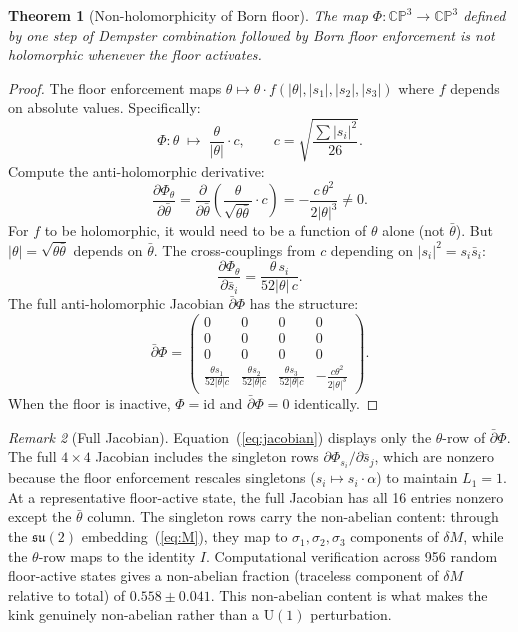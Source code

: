 \documentclass[11pt,a4paper]{article}
\newtheorem{theorem}{Theorem}[section]
\theoremstyle{definition}
\theoremstyle{remark}
\newtheorem{remark}[theorem]{Remark}
\newcommand{\CP}{\mathbb{CP}}
\newcommand{\dbar}{\bar{\partial}}
\newcommand{\su}{\mathfrak{su}}
\begin{document}
\begin{theorem}[Non-holomorphicity of Born floor]\label{thm:nonholo}
The map $\Phi:\CP^3\to\CP^3$ defined by one step of Dempster combination followed by Born floor enforcement is not holomorphic whenever the floor activates.
\end{theorem}

\begin{proof}
The floor enforcement maps $\theta\mapsto\theta\cdot f(|\theta|,|s_1|,|s_2|,|s_3|)$ where $f$ depends on absolute values. Specifically:
\[
\Phi:\theta\;\mapsto\;\frac{\theta}{|\theta|}\cdot c,\qquad c=\sqrt{\frac{\sum|s_i|^2}{26}}.
\]
Compute the anti-holomorphic derivative:
\begin{equation}\label{eq:kink}
\frac{\partial\Phi_\theta}{\partial\bar{\theta}}=\frac{\partial}{\partial\bar{\theta}}\!\left(\frac{\theta}{\sqrt{\theta\bar{\theta}}}\cdot c\right)=-\frac{c\,\theta^2}{2|\theta|^3}\neq 0.
\end{equation}
For $f$ to be holomorphic, it would need to be a function of $\theta$ alone (not $\bar{\theta}$). But $|\theta|=\sqrt{\theta\bar{\theta}}$ depends on $\bar{\theta}$. The cross-couplings from $c$ depending on $|s_i|^2=s_i\bar{s}_i$:
\begin{equation}\label{eq:cross}
\frac{\partial\Phi_\theta}{\partial\bar{s}_i}=\frac{\theta\,s_i}{52|\theta|\,c}.
\end{equation}
The full anti-holomorphic Jacobian $\dbar\Phi$ has the structure:
\begin{equation}\label{eq:jacobian}
\dbar\Phi=\begin{pmatrix}0&0&0&0\\0&0&0&0\\0&0&0&0\\\frac{\theta s_1}{52|\theta|c}&\frac{\theta s_2}{52|\theta|c}&\frac{\theta s_3}{52|\theta|c}&-\frac{c\theta^2}{2|\theta|^3}\end{pmatrix}.
\end{equation}
When the floor is inactive, $\Phi=\mathrm{id}$ and $\dbar\Phi=0$ identically.
\end{proof}

\begin{remark}[Full Jacobian]\label{rem:fulljacobian}
Equation~(\ref{eq:jacobian}) displays only the $\theta$-row of $\dbar\Phi$. The full $4\times 4$ Jacobian includes the singleton rows $\partial\Phi_{s_i}/\partial\bar{s}_j$, which are nonzero because the floor enforcement rescales singletons ($s_i\mapsto s_i\cdot\alpha$) to maintain $L_1=1$. At a representative floor-active state, the full Jacobian has all 16 entries nonzero except the $\bar{\theta}$ column. The singleton rows carry the non-abelian content: through the $\su(2)$ embedding~(\ref{eq:M}), they map to $\sigma_1,\sigma_2,\sigma_3$ components of $\delta M$, while the $\theta$-row maps to the identity $I$. Computational verification across 956 random floor-active states gives a non-abelian fraction (traceless component of $\delta M$ relative to total) of $0.558\pm 0.041$. This non-abelian content is what makes the kink genuinely non-abelian rather than a $\mathrm{U}(1)$ perturbation.
\end{remark}
\end{document}
